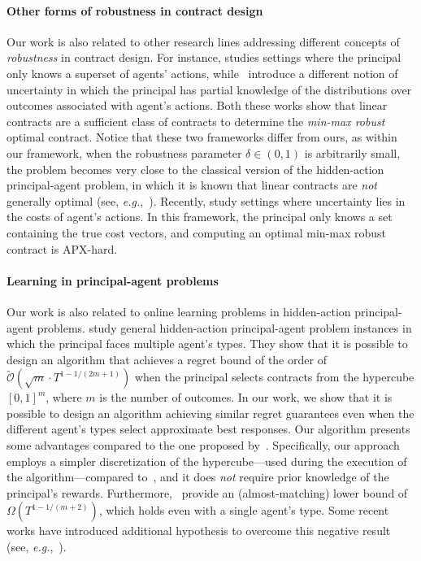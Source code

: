 \paragraph{Other forms of robustness in contract design} 
%
Our work is also related to other research lines addressing different concepts of \emph{robustness} in contract design.
%
%
For instance, \citet{carroll2015robustness} studies settings where the principal only knows a superset of agents' actions, while~\citet{dutting2019simple} introduce a different notion of uncertainty in which the principal has partial knowledge of the distributions over outcomes associated with agent's actions.
%
Both these works show that linear contracts are a sufficient class of contracts to determine the \emph{min-max robust} optimal contract.
%
Notice that these two frameworks differ from ours, as within our framework, when the robustness parameter $\delta \in (0,1)$ is arbitrarily small, the problem becomes very close to the classical version of the hidden-action principal-agent problem, in which it is known that linear contracts are \emph{not} generally optimal (see, \emph{e.g.},~\citep{dutting2019simple}).
%
Recently, \citet{bernasconi2024regret} study settings where uncertainty lies in the costs of agent's actions.
%
In this framework, the principal only knows a set containing the true cost vectors, and computing an optimal min-max robust contract is \textnormal{APX}-hard.
%
\paragraph{Learning in principal-agent problems} 
%
Our work is also related to online learning problems in hidden-action principal-agent problems.
%
\citet{Zhu2023Sample} study general hidden-action principal-agent problem instances in which the principal faces multiple agent's types.
%
They show that it is possible to design an algorithm that achieves a regret bound of the order of $ \widetilde{\mathcal{O}}(\sqrt{m} \cdot T^{1 - 1/(2m+1)})$ when the principal selects contracts from the hypercube $[0,1]^m$, where $m$ is the number of outcomes.
%
In our work, we show that it is possible to design an algorithm achieving similar regret guarantees even when the different agent's types select approximate best responses.
%
Our algorithm presents some advantages compared to the one proposed by~\citet{Zhu2023Sample}. 
%
Specifically, our approach employs a simpler discretization of the hypercube---used during the execution of the algorithm---compared to~\cite{Zhu2023Sample}, and it does \emph{not} require prior knowledge of the principal's rewards.
%
Furthermore,~\citet{Zhu2023Sample} provide an (almost-matching) lower bound of $\Omega(T^{1-1/(m+2)})$, which holds even with a single agent's type.
%
Some recent works have introduced additional hypothesis to overcome this negative result (see, \emph{e.g.},~\cite{bacchiocchilearning,chen2024bounded}).